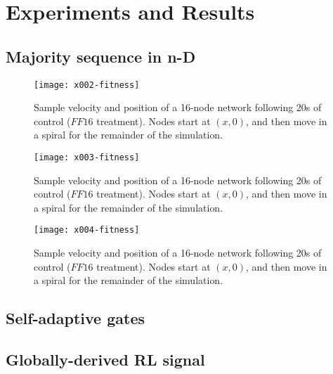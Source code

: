 \section{Experiments and Results}\label{s:results}


\subsection{Majority sequence in n-D}

\begin{figure}[htb]
\centering\texttt{[image: x002-fitness]}
\caption{Sample velocity and position of a 16-node network following 20s of control ($FF16$ treatment).  Nodes start at $(x,0)$, and then move in a spiral for the remainder of the simulation.}
\label{f:2-fixed-movement}
\end{figure}

\begin{figure}[htb]
\centering\texttt{[image: x003-fitness]}
\caption{Sample velocity and position of a 16-node network following 20s of control ($FF16$ treatment).  Nodes start at $(x,0)$, and then move in a spiral for the remainder of the simulation.}
\label{f:2-fixed-movement}
\end{figure}

\begin{figure}[htb]
\centering\texttt{[image: x004-fitness]}
\caption{Sample velocity and position of a 16-node network following 20s of control ($FF16$ treatment).  Nodes start at $(x,0)$, and then move in a spiral for the remainder of the simulation.}
\label{f:2-fixed-movement}
\end{figure}




\subsection{Self-adaptive gates}


\subsection{Globally-derived RL signal}

